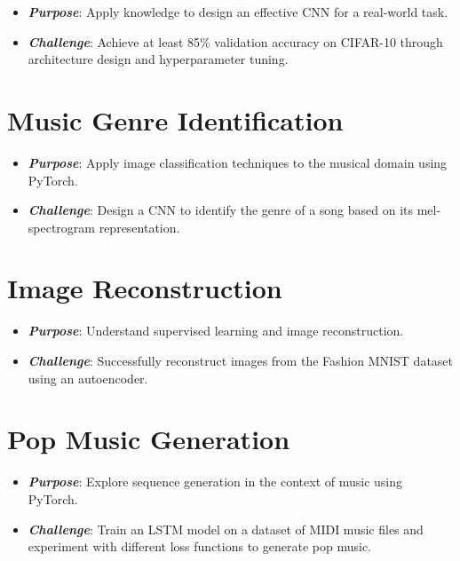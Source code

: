 \documentclass[
]{book}
\begin{document}
\begin{itemize}
\item
  \textbf{\emph{Purpose}}: Apply knowledge to design an effective CNN for a real-world task.
\item
  \textbf{\emph{Challenge}}: Achieve at least 85\% validation accuracy on CIFAR-10 through architecture design and hyperparameter tuning.
\end{itemize}

\hypertarget{Music_Genre_Identification}{%
\section{Music Genre Identification}\label{Music_Genre_Identification}}

\begin{itemize}
\item
  \textbf{\emph{Purpose}}: Apply image classification techniques to the musical domain using PyTorch.
\item
  \textbf{\emph{Challenge}}: Design a CNN to identify the genre of a song based on its mel-spectrogram representation.
\end{itemize}

\hypertarget{Image_Reconstruction}{%
\section{Image Reconstruction}\label{Image_Reconstruction}}

\begin{itemize}
\item
  \textbf{\emph{Purpose}}: Understand supervised learning and image reconstruction.
\item
  \textbf{\emph{Challenge}}: Successfully reconstruct images from the Fashion MNIST dataset using an autoencoder.
\end{itemize}

\hypertarget{Pop_Music_Generation}{%
\section{Pop Music Generation}\label{Pop_Music_Generation}}

\begin{itemize}
\item
  \textbf{\emph{Purpose}}: Explore sequence generation in the context of music using PyTorch.
\item
  \textbf{\emph{Challenge}}: Train an LSTM model on a dataset of MIDI music files and experiment with different loss functions to generate pop music.
\end{itemize}
\end{document}
